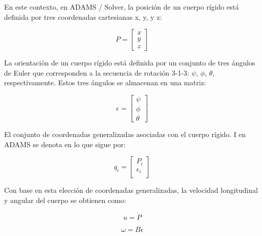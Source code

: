         En este contexto, en ADAMS / Solver, la posición de un cuerpo rígido está definida por tres coordenadas cartesianas x, y, y z:
        

        \begin{equation}
           P = \begin{bmatrix}
                x\\
                y\\
                z
            \end{bmatrix}
        \end{equation}

        
        La orientación de un cuerpo rígido está definida por un conjunto de tres ángulos de Euler que corresponden a la secuencia de rotación 3-1-3: $\psi$, $\phi$, $\theta$, respectivamente. Estos tres ángulos se almacenan en una matriz:
        
        \begin{equation}
           \epsilon = \begin{bmatrix}
                \psi\\
                \phi\\
                \theta
            \end{bmatrix}
        \end{equation}
        
        El conjunto de coordenadas generalizadas asociadas con el cuerpo rígido. I en ADAMS se denota en lo que sigue por:
        
        \begin{equation}
           q_{i} = \begin{bmatrix}
                P_{i}\\
                \epsilon_{i}\\
            \end{bmatrix}
        \end{equation}
        
        Con base en esta elección de coordenadas generalizadas, la velocidad longitudinal y angular del cuerpo se obtienen como:
        
        \begin{equation}
            u = \dot{P}
        \end{equation}
        
        \begin{equation}
            \omega = B\dot{\epsilon}
        \end{equation}
        
